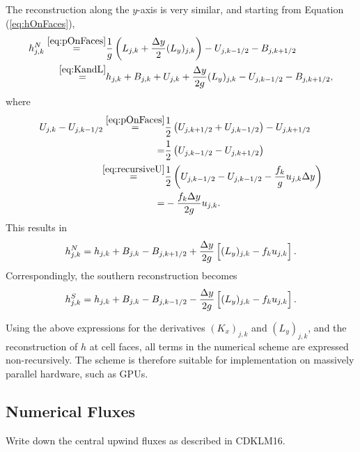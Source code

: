 \documentclass[11pt, a4paper]{article}
\newcommand{\dy}[0]{\Delta y}
\newcommand{\red}[1]{{\color{red}#1}}
\newcommand{\eref}[1]{Equation (\ref{eq:#1})}
\begin{document}
The reconstruction along the $y$-axis is very similar, and starting from \eref{hOnFaces},
\begin{equation}
	\begin{split}
		h_{j,k}^N \overset{\eqref{eq:pOnFaces}}{=}& \frac{1}{g} \left( L_{j,k} + \frac{\dy}{2}(L_y)_{j,k} \right) - U_{j,k-1/2} - B_{j,k+1/2} \\
				\overset{\eqref{eq:KandL}}{=}&  h_{j,k} + B_{j,k} + U_{j,k} + \frac{\dy}{2g}(L_y)_{j,k} - U_{j,k-1/2} - B_{j,k+1/2},
	\end{split}
	\label{eq:hN1}
\end{equation}
where
\begin{equation}
	\begin{split}
		U_{j,k} - U_{j,k-1/2}  \overset{\eqref{eq:pOnFaces}}{=}& \frac{1}{2} \left(U_{j,k+1/2} + U_{j,k-1/2} \right) - U_{j,k+1/2} \\
						=& \frac{1}{2}\left(U_{j,k-1/2} - U_{j,k+1/2} \right)  \\
						\overset{\eqref{eq:recursiveU}}{=}& \frac{1}{2} \left( U_{j,k-1/2} - U_{j,k-1/2} - \frac{f_k}{g} u_{j,k} \dy \right) \\
						=& - \frac{f_k \dy}{2g} u_{j,k}.
	\end{split}
	\label{eq:hN2}
\end{equation}
This results in 
\begin{equation}
	h_{j,k}^N = h_{j,k} + B_{j,k} - B_{j,k+1/2} + \frac{\dy}{2g} \left[ (L_y)_{j,k} - f_{k} u_{j,k} \vphantom{f^{2^2}}\right].
	\label{eq:hN}
\end{equation}
Correspondingly, the southern reconstruction becomes
\begin{equation}
	h_{j,k}^S = h_{j,k} + B_{j,k} - B_{j,k-1/2} - \frac{\dy}{2g} \left[ (L_y)_{j,k} - f_{k} u_{j,k} \vphantom{f^{2^2}} \right].
	\label{eq:hN}
\end{equation}

Using the above expressions for the derivatives $(K_x)_{j,k}$ and $(L_y)_{j,k}$, and the reconstruction of $h$ at cell faces, all terms in the numerical scheme are expressed non-recursively.
The scheme is therefore suitable for implementation on massively parallel hardware, such as GPUs.


\subsection{Numerical Fluxes}

\red{Write down the central upwind fluxes as described in CDKLM16.}
\end{document}
